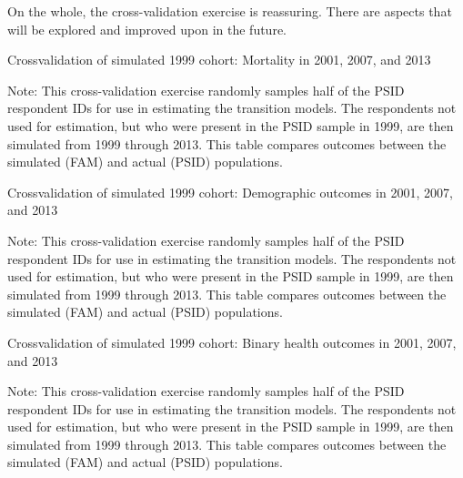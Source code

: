 \noindent On the whole, the cross-validation exercise is reassuring. There are aspects that will be explored and improved upon in the future.

\begin{table}[H]
\begin{threeparttable}
\caption{Crossvalidation of simulated 1999 cohort: Mortality in 2001, 2007, and 2013}
\label{table:crossval_unweighted}
\centering
\footnotesize

\begin{tablenotes}
\footnotesize
\item Note: This cross-validation exercise randomly samples half of the PSID respondent IDs for use in estimating the transition models. The respondents not used for estimation, but who were present in the PSID sample in 1999, are then simulated from 1999 through 2013. This table compares outcomes between the simulated (FAM) and actual (PSID) populations.
\end{tablenotes}
\end{threeparttable}
\end{table}

\begin{table}[H]
\begin{threeparttable}
\caption{Crossvalidation of simulated 1999 cohort: Demographic outcomes in 2001, 2007, and 2013}
\label{table:crossval_demog}
\centering
\footnotesize

\begin{tablenotes}
\footnotesize
\item Note: This cross-validation exercise randomly samples half of the PSID respondent IDs for use in estimating the transition models. The respondents not used for estimation, but who were present in the PSID sample in 1999, are then simulated from 1999 through 2013. This table compares outcomes between the simulated (FAM) and actual (PSID) populations.
\end{tablenotes}
\end{threeparttable}
\end{table}

\begin{table}[H]
\begin{threeparttable}
\caption{Crossvalidation of simulated 1999 cohort: Binary health outcomes in 2001, 2007, and 2013}
\label{table:crossval_binhlth}
\centering
\footnotesize

\begin{tablenotes}
\footnotesize
\item Note: This cross-validation exercise randomly samples half of the PSID respondent IDs for use in estimating the transition models. The respondents not used for estimation, but who were present in the PSID sample in 1999, are then simulated from 1999 through 2013. This table compares outcomes between the simulated (FAM) and actual (PSID) populations.
\end{tablenotes}
\end{threeparttable}
\end{table}

